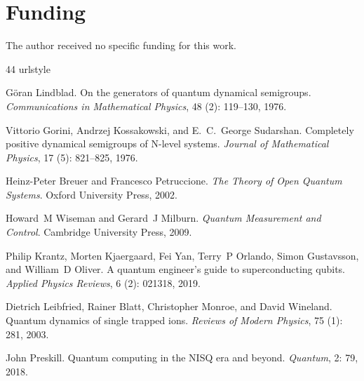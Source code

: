 \documentclass[11pt]{article}
\begin{document}
\section*{Funding}
The author received no specific funding for this work.

\begin{thebibliography}{44}
\providecommand{\natexlab}[1]{#1}
\providecommand{\url}[1]{\texttt{#1}}
\expandafter\ifx\csname urlstyle\endcsname\relax
  \providecommand{\doi}[1]{doi: #1}\else
  \providecommand{\doi}{doi: \begingroup \urlstyle{rm}\Url}\fi

G{\"o}ran Lindblad.
\newblock On the generators of quantum dynamical semigroups.
\newblock \emph{Communications in Mathematical Physics}, 48
  (2): 119--130, 1976.

Vittorio Gorini, Andrzej Kossakowski, and E.~C.~George Sudarshan.
\newblock Completely positive dynamical semigroups of {N}-level systems.
\newblock \emph{Journal of Mathematical Physics}, 17 (5):
  821--825, 1976.

Heinz-Peter Breuer and Francesco Petruccione.
\newblock \emph{The Theory of Open Quantum Systems}.
\newblock Oxford University Press, 2002.

Howard~M Wiseman and Gerard~J Milburn.
\newblock \emph{Quantum Measurement and Control}.
\newblock Cambridge University Press, 2009.

Philip Krantz, Morten Kjaergaard, Fei Yan, Terry~P Orlando, Simon Gustavsson,
  and William~D Oliver.
\newblock A quantum engineer's guide to superconducting qubits.
\newblock \emph{Applied Physics Reviews}, 6 (2): 021318,
  2019.

Dietrich Leibfried, Rainer Blatt, Christopher Monroe, and David Wineland.
\newblock Quantum dynamics of single trapped ions.
\newblock \emph{Reviews of Modern Physics}, 75 (1): 281,
  2003.

John Preskill.
\newblock Quantum computing in the {NISQ} era and beyond.
\newblock \emph{Quantum}, 2: 79, 2018.


\end{thebibliography}
\end{document}
